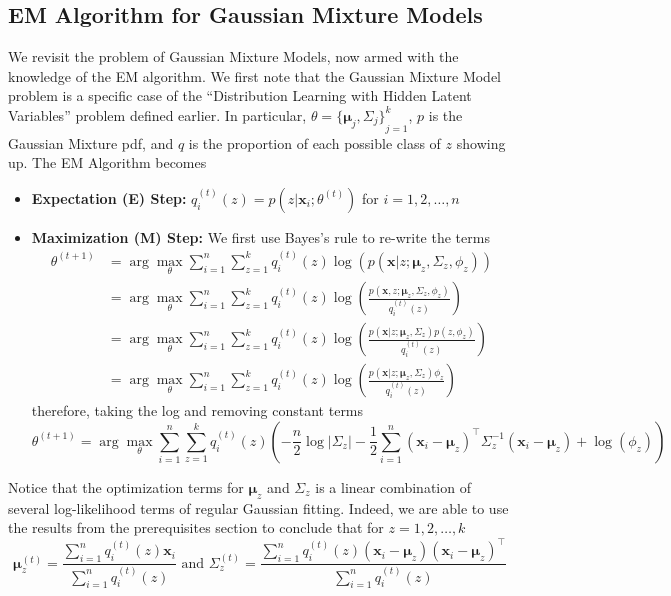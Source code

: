 \subsection{EM Algorithm for Gaussian Mixture Models}
We revisit the problem of Gaussian Mixture Models, now armed with the knowledge of the EM algorithm. We first note that the Gaussian Mixture Model problem is a specific case of the ``Distribution Learning with Hidden Latent Variables'' problem defined earlier. In particular, $\theta={\{\boldsymbol{\mu}_j,\Sigma_j\}}_{j=1}^k$, $p$ is the Gaussian Mixture pdf, and $q$ is the proportion of each possible class of $z$ showing up. The EM Algorithm becomes
\begin{itemize}
    \item \textbf{Expectation (E) Step:} $q_i^{(t)}(z)=p(z|\mathbf{x}_i;\theta^{(t)})$ for $i=1,2,\dots,n$
    \item \textbf{Maximization (M) Step:} We first use Bayes's rule to re-write the terms
    \begin{align*}
        \theta^{(t+1)} 
        &= \arg\max_{\theta} \sum_{i=1}^n \sum_{z=1}^k q_i^{(t)}(z) \log(p(\mathbf{x}|z;\boldsymbol{\mu}_z,\Sigma_z,\phi_z)) \\
        &= \arg\max_{\theta} \sum_{i=1}^n \sum_{z=1}^k q_i^{(t)}(z) \log\left(\frac{p(\mathbf{x},z;\boldsymbol{\mu}_z,\Sigma_z,\phi_z)}{q_i^{(t)}(z)}\right) \\
        &= \arg\max_{\theta} \sum_{i=1}^n \sum_{z=1}^k q_i^{(t)}(z) \log\left(\frac{p(\mathbf{x}|z;\boldsymbol{\mu}_z,\Sigma_z)p(z,\phi_z)}{q_i^{(t)}(z)}\right) \\
        &= \arg\max_{\theta} \sum_{i=1}^n \sum_{z=1}^k q_i^{(t)}(z) \log\left(\frac{p(\mathbf{x}|z;\boldsymbol{\mu}_z,\Sigma_z)\phi_z}{q_i^{(t)}(z)}\right)
    \end{align*}
    therefore, taking the log and removing constant terms
    \[
        \theta^{(t+1)} = \arg\max_{\theta} \sum_{i=1}^n \sum_{z=1}^k q_i^{(t)}(z) 
        \left(
            -\frac{n}{2} \log |\Sigma_z|
            - \frac{1}{2} \sum_{i=1}^n (\mathbf{x}_i - \boldsymbol{\mu}_z)^\top \Sigma_z^{-1} (\mathbf{x}_i - \boldsymbol{\mu}_z)
            + \log(\phi_z)
        \right)
    \]
\end{itemize}
Notice that the optimization terms for $\boldsymbol{\mu}_z$ and $\Sigma_z$ is a linear combination of several log-likelihood terms of regular Gaussian fitting. Indeed, we are able to use the results from the prerequisites section to conclude that for $z=1,2,\dots,k$
\[
\boldsymbol{\mu}_z^{(t)} = \frac{\sum_{i=1}^n q_i^{(t)}(z) \mathbf{x}_i}{\sum_{i=1}^n q_i^{(t)}(z)}
\text{ and }
\Sigma_z^{(t)}  = \frac{\sum_{i=1}^n q_i^{(t)}(z) (\mathbf{x}_i-\boldsymbol{\mu}_z)(\mathbf{x}_i-\boldsymbol{\mu}_z)^\top}{\sum_{i=1}^n q_i^{(t)}(z)}
\]

